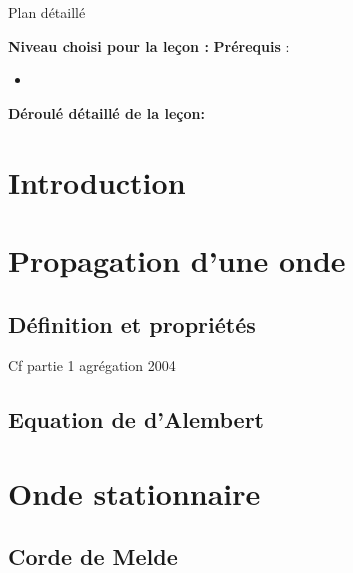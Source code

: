 \begin{reportBlock}{Plan détaillé}

  \textbf{Niveau choisi pour la leçon :}
  \newline
  \textbf{Prérequis} : \begin{itemize}
      \item 
  \end{itemize}

  \textbf{Déroulé détaillé de la leçon: }  
  
  \section*{Introduction}

  \section{Propagation d'une onde}
  
  \subsection{Définition et propriétés} 
  Cf partie 1 agrégation 2004

  \subsection{Equation de d'Alembert}
  
  \section{Onde stationnaire}

  \subsection{Corde de Melde}

  \section{}


\end{reportBlock}